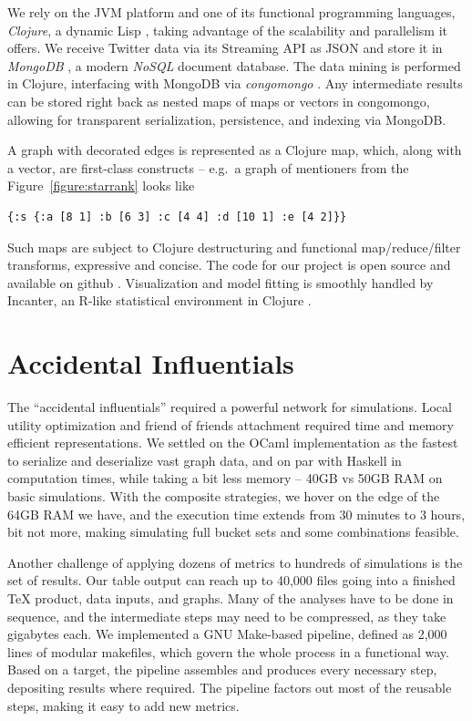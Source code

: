 \documentclass[10pt,oneside]{memoir}
\begin{document}
\begin{Spacing}{2}
We rely on the JVM platform and one of its functional programming languages, \emph{Clojure}, a dynamic Lisp \cite{code:clojure}, taking advantage of the scalability and parallelism it offers.  We receive Twitter data via its Streaming API as JSON and store it in \emph{MongoDB} \cite{code:mongodb}, a modern \emph{NoSQL} document database.  The data mining is performed in Clojure, interfacing with MongoDB via \emph{congomongo} \cite{code:congomongo}.  Any intermediate results can be stored right back as nested maps of maps or vectors in congomongo, allowing for transparent serialization, persistence, and indexing via MongoDB.  


A graph with decorated edges is represented as a Clojure map, which, along with a vector, are first-class constructs -- e.g.\ a graph of mentioners from the Figure~\ref{figure:starrank} looks like 



{\footnotesize
\begin{verbatim}
{:s {:a [8 1] :b [6 3] :c [4 4] :d [10 1] :e [4 2]}}    
\end{verbatim}
}
Such maps are subject to Clojure destructuring and functional map/reduce/filter transforms, expressive and concise.  The code for our project is open source and available on github \cite{code:mongol}.  Visualization and model fitting is smoothly handled by Incanter, an R-like statistical environment in Clojure \cite{code:incanter}.


\pagebreak \section{Accidental Influentials}
\label{accidentalinfluentials}

The ``accidental influentials'' required a powerful network for simulations.  Local utility optimization and friend of friends attachment required time and memory efficient representations.  We settled on the OCaml implementation as the fastest to serialize and deserialize vast graph data, and on par with Haskell in computation times, while taking a bit less memory -- 40GB vs 50GB RAM on basic simulations.  With the composite strategies, we hover on the edge of the 64GB RAM we have, and the execution time extends from 30 minutes to 3 hours, bit not more, making simulating full bucket sets and some combinations feasible.


Another challenge of applying dozens of metrics to hundreds of simulations is the set of results.  Our  table output can reach up to 40,000 files going into a finished {\TeX}  product, data inputs, and graphs.  Many of the analyses have to be done in sequence, and the intermediate steps may need to be compressed, as they take gigabytes each.  We implemented a GNU Make-based pipeline, defined as 2,000 lines of modular makefiles, which govern the whole process in a functional way.  Based on a target, the pipeline assembles and produces every necessary step, depositing results where required.  The pipeline factors out most of the reusable steps, making it easy to add new metrics.



\end{Spacing}
\end{document}

